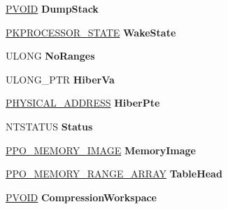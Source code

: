 \begin{DoxyCompactItemize}
\hyperlink{interfacevoid}{P\+V\+O\+ID} {\bfseries Dump\+Stack}
\item 
\mbox{\label{struct___p_o_p___h_i_b_e_r___c_o_n_t_e_x_t_a00c4f187080ce7331d01adc89151d92e}} 
\hyperlink{struct___k_p_r_o_c_e_s_s_o_r___s_t_a_t_e}{P\+K\+P\+R\+O\+C\+E\+S\+S\+O\+R\+\_\+\+S\+T\+A\+TE} {\bfseries Wake\+State}
\item 
\mbox{\label{struct___p_o_p___h_i_b_e_r___c_o_n_t_e_x_t_a109b1c49ca914daf430cfbdcb07f0293}} 
U\+L\+O\+NG {\bfseries No\+Ranges}
\item 
\mbox{\label{struct___p_o_p___h_i_b_e_r___c_o_n_t_e_x_t_ab9581c5bec0167debe09c3d05c85893b}} 
U\+L\+O\+N\+G\+\_\+\+P\+TR {\bfseries Hiber\+Va}
\item 
\mbox{\label{struct___p_o_p___h_i_b_e_r___c_o_n_t_e_x_t_a0d6cf085297e6ece907e50466dd90b18}} 
\hyperlink{union___l_a_r_g_e___i_n_t_e_g_e_r}{P\+H\+Y\+S\+I\+C\+A\+L\+\_\+\+A\+D\+D\+R\+E\+SS} {\bfseries Hiber\+Pte}
\item 
\mbox{\label{struct___p_o_p___h_i_b_e_r___c_o_n_t_e_x_t_a42f98adfa399cd82cda91f5eef742c85}} 
N\+T\+S\+T\+A\+T\+US {\bfseries Status}
\item 
\mbox{\label{struct___p_o_p___h_i_b_e_r___c_o_n_t_e_x_t_a4394fdfcb63f45f6c5e90650212b5080}} 
\hyperlink{struct___p_o___m_e_m_o_r_y___i_m_a_g_e}{P\+P\+O\+\_\+\+M\+E\+M\+O\+R\+Y\+\_\+\+I\+M\+A\+GE} {\bfseries Memory\+Image}
\item 
\mbox{\label{struct___p_o_p___h_i_b_e_r___c_o_n_t_e_x_t_af46252ee5a1f501bd4c8b24220c685e1}} 
\hyperlink{struct___p_o___m_e_m_o_r_y___r_a_n_g_e___a_r_r_a_y}{P\+P\+O\+\_\+\+M\+E\+M\+O\+R\+Y\+\_\+\+R\+A\+N\+G\+E\+\_\+\+A\+R\+R\+AY} {\bfseries Table\+Head}
\item 
\mbox{\label{struct___p_o_p___h_i_b_e_r___c_o_n_t_e_x_t_a5ff08f31592680f13f3532f2de87380a}} 
\hyperlink{interfacevoid}{P\+V\+O\+ID} {\bfseries Compression\+Workspace}

\end{DoxyCompactItemize}
